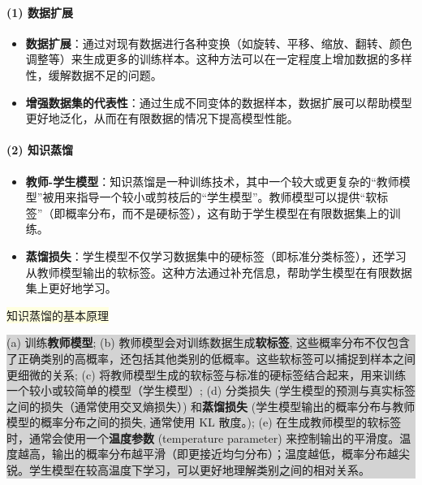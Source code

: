 \documentclass[twocolumn, 10pt]{article} %
\begin{document}
\paragraph{(1) 数据扩展}
\begin{itemize}[left=2em] %
    \item \textbf{数据扩展}：通过对现有数据进行各种变换（如旋转、平移、缩放、翻转、颜色调整等）来生成更多的训练样本。这种方法可以在一定程度上增加数据的多样性，缓解数据不足的问题。
    \item \textbf{增强数据集的代表性}：通过生成不同变体的数据样本，数据扩展可以帮助模型更好地泛化，从而在有限数据的情况下提高模型性能。
\end{itemize}


\paragraph{(2) 知识蒸馏} 
\begin{itemize}[left=2em] %
    \item \textbf{教师-学生模型}：知识蒸馏是一种训练技术，其中一个较大或更复杂的“教师模型”被用来指导一个较小或剪枝后的“学生模型”。教师模型可以提供“软标签”（即概率分布，而不是硬标签），这有助于学生模型在有限数据集上的训练。
    \item \textbf{蒸馏损失}：学生模型不仅学习数据集中的硬标签（即标准分类标签），还学习从教师模型输出的软标签。这种方法通过补充信息，帮助学生模型在有限数据集上更好地学习。
\end{itemize}


\noindent
\colorbox{lightyellow}{
知识蒸馏的基本原理
}

\noindent
\colorbox{lightgray}{
\begin{minipage}{\dimexpr\columnwidth-2\fboxsep\relax}%
        \raggedright %

(a) 训练\textbf{教师模型}; (b) 教师模型会对训练数据生成\textbf{软标签}, 这些概率分布不仅包含了正确类别的高概率，还包括其他类别的低概率。这些软标签可以捕捉到样本之间更细微的关系; (c) 将教师模型生成的软标签与标准的硬标签结合起来，用来训练一个较小或较简单的模型（学生模型）; (d) 分类损失 (学生模型的预测与真实标签之间的损失（通常使用交叉熵损失）) 和\textbf{蒸馏损失} (学生模型输出的概率分布与教师模型的概率分布之间的损失, 通常使用 KL 散度。); (e) 在生成教师模型的软标签时，通常会使用一个\textbf{温度参数} (temperature parameter) 来控制输出的平滑度。温度越高，输出的概率分布越平滑（即更接近均匀分布）；温度越低，概率分布越尖锐。学生模型在较高温度下学习，可以更好地理解类别之间的相对关系。
\end{minipage}
}
\end{document}
